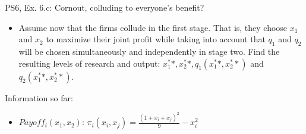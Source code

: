 \begin{frame}{PS6, Ex. 6.c: Cornout, colluding to everyone's benefit?}
    \begin{itemize}
    \item[(c)] Assume now that the firms collude in the first stage. That is, they choose $x_1$ and $x_2$ to maximize their joint profit while taking into account that $q_1$ and $q_2$ will be chosen simultaneously and independently in stage two. Find the resulting levels of research and output: $x_1^**,x_2^**,q_1(x_1^**,x_2^**)$ and $q_2(x_1^**,x_2^**)$.
    \end{itemize}
    \vfill\null
  \begin{multicols}{2}
    \vfill\null \columnbreak
    Information so far:
    \begin{itemize}
    \item[1] $Payoff_i(x_1,x_2)$: $\pi_i(x_i,x_j) = \frac{(1+x_i+x_j)^2}{9}-x_i^2 $
    \end{itemize}
    \vfill\null
  \end{multicols}
\end{frame}


